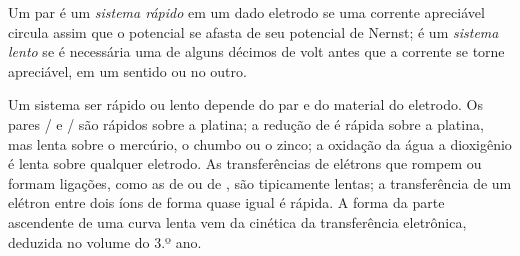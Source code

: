 \begin{definition}\label{def:b2:current-potential-curves:fast-slow}
Um par é um \emph{sistema rápido} em um dado eletrodo se
uma corrente apreciável circula assim que o potencial se afasta de seu
potencial de Nernst; é um \emph{sistema lento} se é
necessária uma  de alguns décimos de volt antes que a corrente se
torne apreciável, em um sentido ou no outro.
\end{definition}

Um sistema ser rápido ou lento depende do par e do material do eletrodo. Os
pares / e / são rápidos sobre a platina; a
redução de  é rápida sobre a platina, mas lenta sobre o mercúrio, o
chumbo ou o zinco; a oxidação da água a dioxigênio é lenta sobre qualquer
eletrodo. As transferências de elétrons que rompem ou formam ligações, como as
de  ou de , são tipicamente lentas; a transferência de um elétron
entre dois íons de forma quase igual é rápida. A forma da parte ascendente
de uma curva lenta vem da cinética da transferência eletrônica, deduzida no
volume do 3.º ano.


